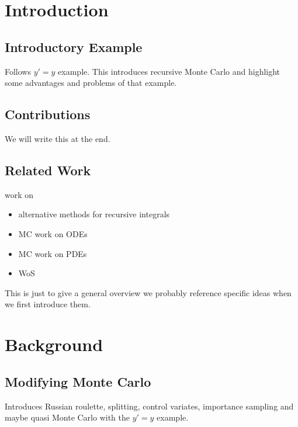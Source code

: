 \documentclass[a4paper,12pt,fleqn]{article}
\begin{document}
\begin{comment}
\title{Unbiased Monte Carlo for Recursive Integrals}
\author{Isidoor Pinillo Esquivel}
\maketitle
\end{comment}



\newpage
\tableofcontents
\newpage

\begin{abstract}
    We will write this at the end.
\end{abstract}

\section{Introduction}

\subsection{Introductory Example}
Follows $y'=y$ example. This introduces recursive Monte Carlo and
highlight some advantages and problems of that example.

\subsection{Contributions}
We will write this at the end.

\subsection{Related Work}
work on
\begin{itemize}
    \item alternative methods for recursive integrals
    \item MC work on ODEs
    \item MC work on PDEs
    \item WoS
\end{itemize}
This is just to give a general overview we probably reference specific ideas when we first introduce them.

\section{Background}
\subsection{Modifying Monte Carlo}
Introduces Russian roulette, splitting, control variates, importance sampling and maybe quasi Monte Carlo with the
$y'=y$ example.
\end{document}
